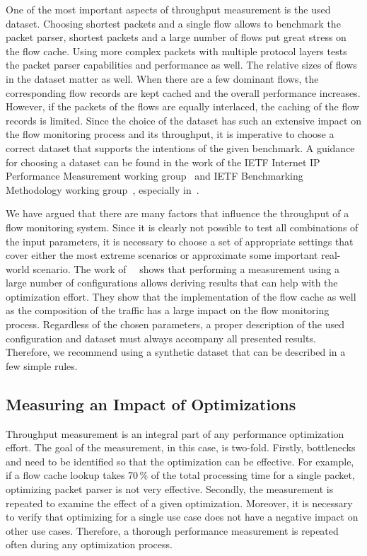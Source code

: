 One of the most important aspects of throughput measurement is the used dataset. Choosing shortest packets and a single flow allows to benchmark the packet parser, shortest packets and a large number of flows put great stress on the flow cache. Using more complex packets with multiple protocol layers tests the packet parser capabilities and performance as well. The relative sizes of flows in the dataset matter as well. When there are a few dominant flows, the corresponding flow records are kept cached and the overall performance increases. However, if the packets of the flows are equally interlaced, the caching of the flow records is limited. Since the choice of the dataset has such an extensive impact on the flow monitoring process and its throughput, it is imperative to choose a correct dataset that supports the intentions of the given benchmark. A guidance for choosing a dataset can be found in the work of the IETF Internet IP Performance Measurement working group~\cite{IESG-1997-IP} and IETF Benchmarking Methodology working group~\cite{IESG-1989-Benchmarking}, especially in~\cite{rfc2330, rfc6985}.

We have argued that there are many factors that influence the throughput of a flow monitoring system. Since it is clearly not possible to test all combinations of the input parameters, it is necessary to choose a set of appropriate settings that cover either the most extreme scenarios or approximate some important real-world scenario. The work of~\citeauthor{Nassopulos-2014-Flow}~\cite{Nassopulos-2014-Flow} shows that performing a measurement using a large number of configurations allows deriving results that can help with the optimization effort. They show that the implementation of the flow cache as well as the composition of the traffic has a large impact on the flow monitoring process. Regardless of the chosen parameters, a proper description of the used configuration and dataset must always accompany all presented results. Therefore, we recommend using a synthetic dataset that can be described in a few simple rules.


\subsection{Measuring an Impact of Optimizations}

Throughput measurement is an integral part of any performance optimization effort. The goal of the measurement, in this case, is two-fold. Firstly, bottlenecks and need to be identified so that the optimization can be effective. For example, if a flow cache lookup takes 70\,\% of the total processing time for a single packet, optimizing packet parser is not very effective. Secondly, the measurement is repeated to examine the effect of a given optimization. Moreover, it is necessary to verify that optimizing for a single use case does not have a negative impact on other use cases. Therefore, a thorough performance measurement is repeated often during any optimization process.

